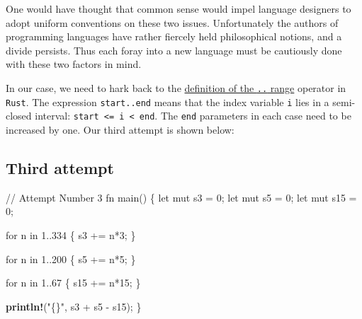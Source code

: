 \documentclass[
  a4paper,
]{article}
\newenvironment{Shaded}{\begin{snugshade}}{\end{snugshade}}
\newcommand{\CommentTok}[1]{\textcolor[rgb]{0.50,0.62,0.50}{#1}}
\newcommand{\ControlFlowTok}[1]{\textcolor[rgb]{0.94,0.87,0.69}{#1}}
\newcommand{\DecValTok}[1]{\textcolor[rgb]{0.86,0.86,0.80}{#1}}
\newcommand{\KeywordTok}[1]{\textcolor[rgb]{0.94,0.87,0.69}{#1}}
\newcommand{\NormalTok}[1]{\textcolor[rgb]{0.80,0.80,0.80}{#1}}
\newcommand{\OperatorTok}[1]{\textcolor[rgb]{0.94,0.94,0.82}{#1}}
\newcommand{\PreprocessorTok}[1]{\textcolor[rgb]{1.00,0.81,0.69}{\textbf{#1}}}
\newcommand{\StringTok}[1]{\textcolor[rgb]{0.80,0.58,0.58}{#1}}
\begin{document}
One would have thought that common sense would impel language designers
to adopt uniform conventions on these two issues. Unfortunately the
authors of programming languages have rather fiercely held philosophical
notions, and a divide persists. Thus each foray into a new language must
be cautiously done with these two factors in mind.

In our case, we need to hark back to the
\href{https://doc.rust-lang.org/reference/expressions/range-expr.html}{definition
of the \texttt{..} range} operator in \texttt{Rust}. The expression
\texttt{start..end} means that the index variable \texttt{i} lies in a
semi-closed interval: \texttt{start\ \textless{}=\ i\ \textless{}\ end}.
The \texttt{end} parameters in each case need to be increased by one.
Our third attempt is shown below:

\hypertarget{third-attempt}{%
\subsection{Third attempt}\label{third-attempt}}

\begin{Shaded}
\begin{Highlighting}[]
 \CommentTok{// Attempt Number 3}
\KeywordTok{fn}\NormalTok{ main() }\OperatorTok{\{}
    \KeywordTok{let} \KeywordTok{mut}\NormalTok{ s3 }\OperatorTok{=} \DecValTok{0}\OperatorTok{;}
    \KeywordTok{let} \KeywordTok{mut}\NormalTok{ s5 }\OperatorTok{=} \DecValTok{0}\OperatorTok{;}
    \KeywordTok{let} \KeywordTok{mut}\NormalTok{ s15 }\OperatorTok{=} \DecValTok{0}\OperatorTok{;}

    \ControlFlowTok{for}\NormalTok{ n }\KeywordTok{in} \DecValTok{1}\OperatorTok{..}\DecValTok{334} \OperatorTok{\{}
\NormalTok{        s3 }\OperatorTok{+=}\NormalTok{ n}\OperatorTok{*}\DecValTok{3}\OperatorTok{;}
    \OperatorTok{\}}

    \ControlFlowTok{for}\NormalTok{ n }\KeywordTok{in} \DecValTok{1}\OperatorTok{..}\DecValTok{200} \OperatorTok{\{}
\NormalTok{        s5 }\OperatorTok{+=}\NormalTok{ n}\OperatorTok{*}\DecValTok{5}\OperatorTok{;}
    \OperatorTok{\}}

    \ControlFlowTok{for}\NormalTok{ n }\KeywordTok{in} \DecValTok{1}\OperatorTok{..}\DecValTok{67} \OperatorTok{\{}
\NormalTok{        s15 }\OperatorTok{+=}\NormalTok{ n}\OperatorTok{*}\DecValTok{15}\OperatorTok{;}
    \OperatorTok{\}}

    \PreprocessorTok{println!}\NormalTok{(}\StringTok{"\{\}"}\OperatorTok{,}\NormalTok{ s3 }\OperatorTok{+}\NormalTok{ s5 }\OperatorTok{{-}}\NormalTok{ s15)}\OperatorTok{;}
\OperatorTok{\}}
\end{Highlighting}
\end{Shaded}
\end{document}

